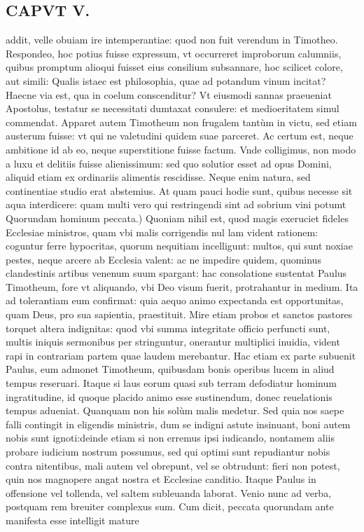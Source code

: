 \documentclass{article}
\begin{document}
\begin{pages}
\section*{CAPVT V. }
\marginpar{[ p.71 ]}\pstart addit, velle obuiam ire intemperantiae: quod non fuit verendum in Timotheo. Respondeo, hoc potius fuisse expressum, vt occurreret improborum calumniis, quibus promptum alioqui fuisset eius consilium subsannare, hoc scilicet colore, aut simili: Qualis istaec est philosophia, quae ad potandum vinum incitat? Haecne via est, qua in coelum conscenditur? Vt eiusmodi sannas praeueniat Apostolus, testatur se necessitati dumtaxat consulere: et medioeritatem simul commendat. Apparet autem Timotheum non frugalem tantùm in victu, sed etiam austerum fuisse: vt qui ne valetudini quidem suae parceret. Ac certum est, neque ambitione id ab eo, neque superstitione fuisse factum. Vnde colligimus, non modo a luxu et delitiis fuisse alienissimum: sed quo solutior esset ad opus Domini, aliquid etiam ex ordinariis alimentis rescidisse. Neque enim natura, sed continentiae studio erat abstemius. At quam pauci hodie sunt, quibus necesse sit aqua interdicere: quam multi vero qui restringendi sint ad sobrium vini potumt  \pend\pstart Quorundam hominum peccata.) Quoniam nihil est, quod magis exeruciet fideles Ecclesiae ministros, quam vbi malis corrigendis nul lam vident rationem: coguntur ferre hypocritas, quorum nequitiam incelligunt: multos, qui sunt noxiae pestes, neque arcere ab Ecclesia valent: ac ne impedire quidem, quominus clandestinis artibus venenum suum spargant: hac consolatione sustentat Paulus Timotheum, fore vt aliquando, vbi Deo visum fuerit, protrahantur in medium. Ita ad tolerantiam eum confirmat: quia aequo animo expectanda est opportunitas, quam Deus, pro sua sapientia, praestituit. Mire etiam probos et sanctos pastores torquet altera indignitas: quod vbi summa integritate officio perfuncti sunt, multis iniquis sermonibus per stringuntur, onerantur multiplici inuidia, vident rapi in contrariam partem quae laudem merebantur. Hac etiam ex parte subuenit Paulus, eum admonet Timotheum, quibusdam bonis operibus lucem in aliud tempus reseruari. Itaque si laus eorum quasi sub terram defodiatur hominum ingratitudine, id quoque placido animo esse sustinendum, donec reuelationis tempus adueniat. Quanquam non his solùm malis medetur. Sed quia nos saepe falli contingit in eligendis ministris, dum se indigni astute insinuant, boni autem nobis sunt ignoti:deinde etiam si non erremus ipsi iudicando, nontamem aliis probare iudicium nostrum possumus, sed qui optimi sunt repudiantur nobis contra nitentibus, mali autem vel obrepunt, vel se obtrudunt: fieri non potest, quin nos magnopere angat nostra et Ecclesiae canditio. Itaque Paulus in offensione vel tollenda, vel saltem subleuanda laborat. Venio nunc ad verba, postquam rem breuiter complexus sum. Cum dicit, peccata quorundam ante manifesta esse intelligit mature  \pend

\end{pages}
\end{document}

